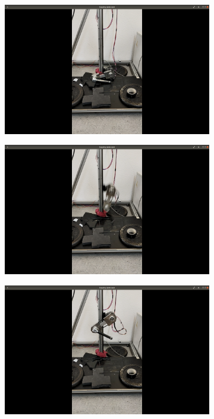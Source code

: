 \documentclass[onecolumn, letter paper]{report}
\begin{document}
\begin{figure}[htb!]
    \centering
    \begin{subfigure}{.24\textwidth}
    \includegraphics[width=\textwidth, trim={25cm 15cm 25cm 5cm}, clip]{figures/0.6m/p6m1.png}
    \end{subfigure}
    \begin{subfigure}{.24\textwidth}
    \includegraphics[width=\textwidth, trim={25cm 15cm 25cm 5cm}, clip]{figures/0.6m/p6m2.png}
    \end{subfigure}
    \begin{subfigure}{.24\textwidth}
    \includegraphics[width=\textwidth, trim={25cm 15cm 25cm 5cm}, clip]{figures/0.6m/p6m3.png}

\end{subfigure}
\end{figure}
\end{document}
